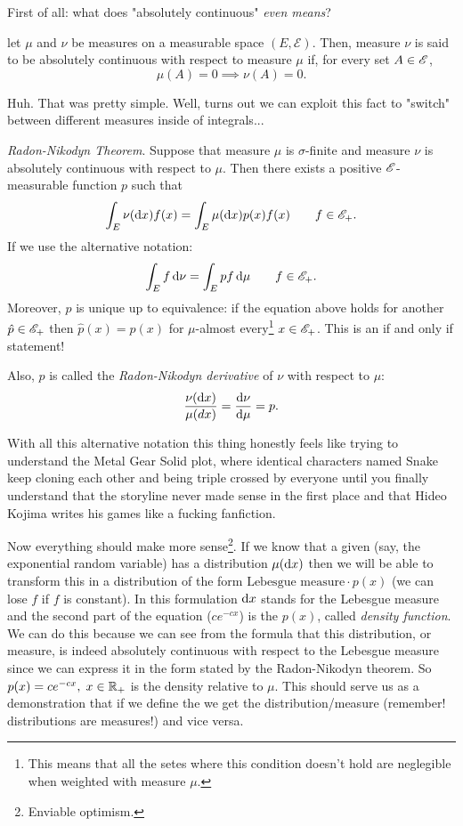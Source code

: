 \documentclass{report}
\begin{document}
	\begin{revise}
		First of all: what does "absolutely continuous" \textit{even means}?
		\begin{definition}
			let $\mu$ and $\nu$ be measures on a measurable space $(E,\mathscr{E})$. Then, measure $\nu$ is said to be absolutely continuous with respect to measure $\mu$ if, for every set $A\in\mathscr{E}$,
			\[\mu(A)=0\implies\nu(A)=0.\]
		\end{definition}
		Huh. That was pretty simple. Well, turns out we can exploit this fact to "switch" between different measures inside of integrals...
		\begin{theorem}
			\emph{Radon-Nikodyn Theorem}.
			Suppose that measure $\mu$ is $\sigma$-finite and measure $\nu$ is absolutely continuous with respect to $\mu$. Then there exists a positive $\mathscr{E}$-measurable function $p$ such that 
			\[\int_E\nu(\mathop{}\!\mathrm{d} x)f(x)=\int_E\mu(\mathop{}\!\mathrm{d} x)p(x)f(x)\qquad f\in\mathscr{E}_+.\]
			If we use the alternative notation:
			\[\int_Ef\mathop{}\!\mathrm{d}\nu =\int_Ep f\mathop{}\!\mathrm{d}\mu \qquad f\in\mathscr{E}_+.\]
			Moreover, $p$ is unique up to equivalence: if the equation above holds for another $\hat{p}\in\mathscr{E}_+$ then $\hat{p}(x)=p(x)$ for $\mu$-almost every\footnote{This means that all the setes where this condition doesn't hold are neglegible when weighted with measure $\mu$.} $x\in\mathscr{E}_+$. This is an if and only if statement!\par
			Also, $p$ is called the \emph{Radon-Nikodyn derivative} of $\nu$ with respect to $\mu$:
			\[\frac{\nu(\mathop{}\!\mathrm{d} x)}{\mu(dx)}=\frac{\mathop{}\!\mathrm{d}\nu}{\mathop{}\!\mathrm{d}\mu}=p.\]
		\end{theorem}
		With all this alternative notation this thing honestly feels like trying to understand the Metal Gear Solid plot, where identical characters named Snake keep cloning each other and being triple crossed by everyone until you finally understand that the storyline never made sense in the first place and that Hideo Kojima writes his games like a fucking fanfiction.
	\end{revise}
	Now everything should make more sense\footnote{Enviable optimism.}. If we know that a given \rv{} (say, the exponential random variable) has a distribution $\mu(\mathop{}\!\mathrm{d} x)$ then we will be able to transform this in a distribution of the form $\text{Lebesgue measure}\cdot p(x)$ (we can lose $f$ if $f$ is constant).
	In this formulation	$\mathop{}\!\mathrm{d} x$ stands for the Lebesgue measure and the second part of the equation ($ce^{-cx}$) is the $p(x)$, called \emph{density function}. We can do this because we can see from the formula that this distribution, or measure, is indeed absolutely continuous with respect to the Lebesgue measure since we can express it in the form stated by the Radon-Nikodyn theorem.
	 So $p(x)=ce^{-cx},\;x\in\mathbb{R}_+$ is the density relative to $\mu$. This should serve us as a demonstration that if we define the \rv{} we get the distribution/measure (remember! distributions are measures!) and vice versa.
\end{document}
